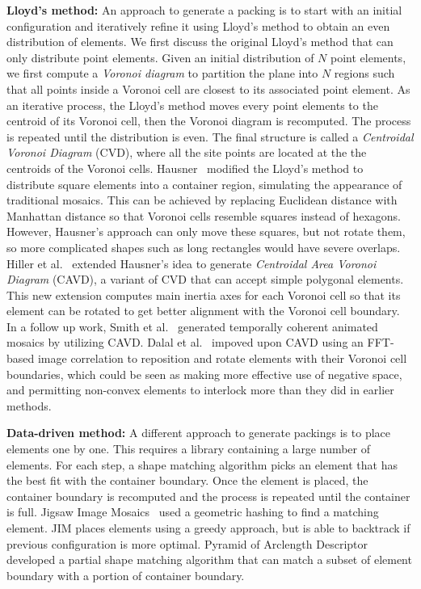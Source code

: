 \textbf{Lloyd's method:}
An approach to generate a packing is to start with an initial configuration and iteratively refine it using Lloyd's method
to obtain an even distribution of elements. 
We first discuss the original Lloyd's method that can only distribute point elements.
Given an initial distribution of $N$ point elements, 
we first compute a \textit{Voronoi diagram} to partition the plane into $N$ regions such that
all points inside a Voronoi cell are closest to its associated point element.
As an iterative process, 
the Lloyd's method moves every point elements to the centroid of its Voronoi cell, 
then the Voronoi diagram is recomputed.
The process is repeated until the distribution is even.
The final structure is called a \textit{Centroidal Voronoi Diagram} (CVD), 
where all the site points are located at the the centroids of the Voronoi cells. 
Hausner~\cite{Hausner2001} modified the Lloyd's method to distribute square elements into a container 
region, simulating the appearance of traditional mosaics. 
This can be achieved by replacing Euclidean distance with Manhattan distance so that Voronoi cells resemble squares instead of hexagons.
However, Hausner's approach can only move these squares, but not rotate them,
so more complicated shapes such as long rectangles would have severe overlaps.
Hiller et al.~\cite{Hiller2003} extended Hausner's idea to generate \textit{Centroidal Area Voronoi Diagram} (CAVD),
a variant of CVD that can accept simple polygonal elements.
This new extension computes main inertia axes for each Voronoi cell so that 
its element can be rotated to get better alignment
with the Voronoi cell boundary.
In a follow up work, Smith et al.~\cite{Smith2005} generated temporally coherent animated mosaics by utilizing CAVD.
Dalal et al.~\cite{Dalal2006} impoved upon CAVD using an FFT-based image correlation to reposition
and rotate elements with their Voronoi cell boundaries, which could be seen as making more effective use of negative
space, and permitting non-convex elements to interlock more than they did in
earlier methods.


\textbf{Data-driven method:} A different approach to generate packings is to
place elements one by one. This requires a library containing
a large number of elements. For each step, a shape matching algorithm
picks an element that has the best fit with the container boundary.
Once the element is placed, the container boundary is recomputed and
the process is repeated until the container is full.
Jigsaw Image Mosaics~\cite{Kim2002} used a geometric hashing to find
a matching element. JIM places elements using a greedy approach, but is able to backtrack 
if previous configuration is more optimal.
Pyramid of Arclength Descriptor~\cite{Kwan2016} developed
a partial shape matching algorithm that can match a subset of element boundary with a portion
of container boundary.

